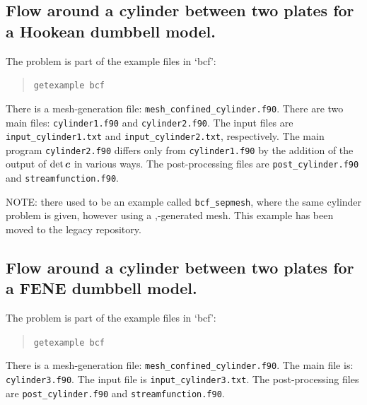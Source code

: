 \subsection{Flow around a cylinder between two plates for a Hookean dumbbell
model.}

The problem is part of the example files in `bcf':
\begin{quote}
   \texttt{getexample bcf}
\end{quote}
There is a mesh-generation file: \texttt{mesh\_confined\_cylinder.f90}.
There are two main files: \texttt{cylinder1.f90} and \texttt{cylinder2.f90}.
The input files are \texttt{input\_cylinder1.txt} and
\texttt{input\_cylinder2.txt}, respectively. The main program
\texttt{cylinder2.f90} differs only from \texttt{cylinder1.f90} by the addition
of the output of $\det\boldsymbol{c}$ in various ways.
The post-processing files are \texttt{post\_cylinder.f90} and 
\texttt{streamfunction.f90}.

NOTE: there used to be an example called \texttt{bcf\_sepmesh}, where the same
cylinder problem is given, however using a \sep-generated mesh. 
This example has been moved to the legacy repository.

\subsection{Flow around a cylinder between two plates for a FENE dumbbell
model.}

The problem is part of the example files in `bcf':
\begin{quote}
   \texttt{getexample bcf}
\end{quote}
There is a mesh-generation file: \texttt{mesh\_confined\_cylinder.f90}.
The main file is: \texttt{cylinder3.f90}.
The input file is \texttt{input\_cylinder3.txt}.
The post-processing files are \texttt{post\_cylinder.f90} and 
\texttt{streamfunction.f90}.

